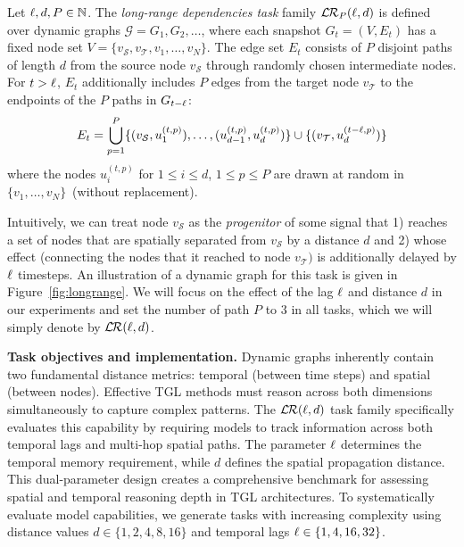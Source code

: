 \begin{definition}
 Let \(\ell, d, P \in \mathbb{N}\). The \emph{long-range dependencies task} family $ \mathcal{L}\hspace{-0.035cm}\mathcal{R}_P(\lag,d)$ is defined over dynamic graphs \(\mathcal{G} = G_1, G_2, \dots\), where each snapshot $G_t = (V, E_t)$ has a fixed node set $V = \{v_{\mathcal S}, v_{\mathcal T}, v_1, \dots, v_{N}\}$. The edge set $E_t$ consists of $P$ disjoint paths of length $d$ from the source node $v_{\mathcal S}$ through randomly chosen intermediate nodes. For $t > \ell$, $E_t$ additionally includes $P$ edges from the target node $v_{\mathcal T}$ to the endpoints of the $P$ paths in $G_{t - \ell}$:
\begin{equation*}
    E_t = \bigcup_{p=1}^P \{(v_{\mathcal S}, u_1^{(t,p)}), %
    \dots, (u_{d-1}^{(t,p)}, u_d^{(t,p)})\} \cup \\ \{(v_{\mathcal T}, u_d^{(t-\lag,p)})\}
\end{equation*}
where the nodes $u^{(t,p)}_{i}$ for $1\leq i\leq d$, $1\leq p \leq P$ are drawn at random in $\{v_1,\dots,v_N\}$~(without replacement).
\end{definition}\label{def:long_range}


Intuitively, we can treat node $v_\mathcal{S}$ as the \textit{progenitor} of some signal that 1) reaches a set of nodes that are spatially separated from $v_\mathcal{S}$ by a distance $d$ and 2) whose effect (connecting the nodes that it reached to node $v_\mathcal{T})$ is additionally delayed by $\ell$ timesteps.
An illustration of a dynamic graph for this task is given in Figure~\ref{fig:longrange}.
We will focus on the effect of the lag $\ell$  and distance $d$ in our experiments and set the number of path $P$ to $3$ in all tasks, which we will simply denote by $\longrange{\lag,d}$.





\textbf{Task objectives and implementation.}
Dynamic graphs inherently contain two fundamental distance metrics: temporal (between time steps) and spatial (between nodes). Effective TGL methods must reason across both dimensions simultaneously to capture complex patterns. The \(\longrange{\lag,d}\) task family specifically evaluates this capability by requiring models to track information across both temporal lags and multi-hop spatial paths. The parameter \(\ell\) determines the temporal memory requirement, while \(d\) defines the spatial propagation distance. This dual-parameter design creates a comprehensive benchmark for assessing spatial and temporal reasoning depth in TGL architectures. To systematically evaluate model capabilities, we generate tasks with increasing complexity using distance values $d \in \{1, 2, 4, 8, 16\}$ and temporal lags $\ell \in \{1, 4, 16, 32\}$.


